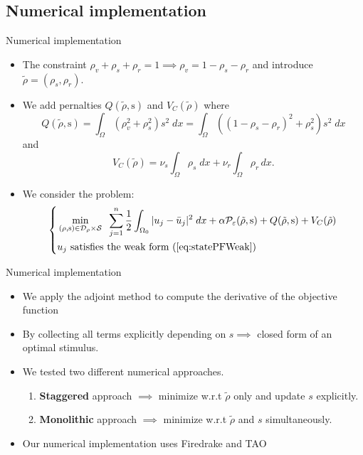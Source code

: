 \documentclass{beamer}
\newcommand{\PP}{\mathcal{P}}
\newcommand{\p}{\rho}
\newcommand{\tp}{\tilde{\rho}}
\newcommand{\e}{\varepsilon}
\newcommand{\OO}{\Omega}
\begin{document}
\subsection{Numerical implementation}
\begin{frame}{Numerical implementation}
    \begin{itemize}
        \item The constraint $\p_v+\p_s+\p_r=1 \implies \p_v= 1 - \p_s - \p_r$ 
        and introduce $\tp = (\p_s,\p_r).$
        \item We add pernalties $Q(\tp,\mathrm{s})$ and $V_C(\tp)$
        where $$Q(\tp,\mathrm{s})=\int_{\OO}(\p_v^2+\p_s^2)s^2\;dx=\int_{\OO}((1-\p_s-\p_r)^2+\p_s^2)s^2\;dx$$ and 
        $$V_C(\tp) = \nu_s\int_{\OO}\p_s\;dx + \nu_r\int_{\OO}\p_r\,dx.$$
        \item We consider the problem:
        \begin{equation}
            \begin{dcases}
            \begin{aligned}
                &\min_{(\p,\mathrm{s}) \in \mathcal{D}_{\p} \times \mathcal{S}}\;\; \sum_{j=1}^n\frac{1}{2}\int_{\OO_0}|u_j-\bar{u}_j|^2\;dx + \alpha\PP_{\e}(\tp,\mathrm{s}) + Q(\tp,\mathrm{s}) + V_C(\tp)\\
                &u_j\text{ satisfies the weak form }(\ref{eq:statePFWeak})
            \end{aligned}
            \end{dcases}
        \end{equation}
    \end{itemize}
\end{frame}

\begin{frame}{Numerical implementation}
    \begin{itemize}
        \item We apply the adjoint method to compute the derivative of the objective function
        \bigskip
        \item By collecting all terms explicitly depending on $s \implies$ 
        closed form of an optimal stimulus.
        \bigskip
        \item We tested two different numerical approaches.
        \bigskip
        \begin{enumerate}
            \item {\bf Staggered} approach $\implies$ minimize w.r.t $\tp$ only and update $s$ explicitly.
            \item {\bf Monolithic} approach $\implies$ minimize w.r.t $\tp$ and $s$ simultaneously.
        \end{enumerate}
        \bigskip
        \item Our numerical implementation uses Firedrake and TAO
    \end{itemize}
\end{frame}
\end{document}
